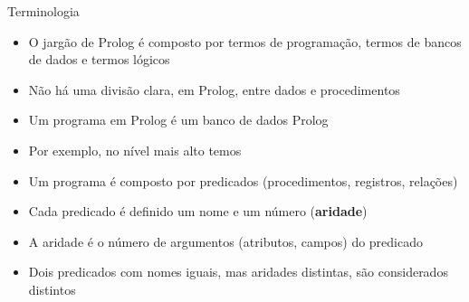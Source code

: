 \begin{frame}[fragile]{Terminologia}

    \begin{itemize}
        \item O jargão de Prolog é composto por termos de programação, termos de bancos de 
            dados e termos lógicos

        \item Não há uma divisão clara, em Prolog, entre dados e procedimentos

        \item Um programa em Prolog é um banco de dados Prolog

        \item Por exemplo, no nível mais alto temos 

        \item Um programa é composto por predicados (procedimentos, registros, relações)

        \item Cada predicado é definido um nome e um número (\textbf{aridade})

        \item A aridade é o número de argumentos (atributos, campos) do predicado

        \item Dois predicados com nomes iguais, mas aridades distintas, são considerados 
            distintos
    \end{itemize}

\end{frame}


